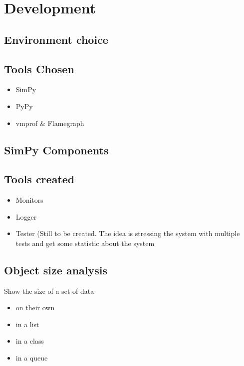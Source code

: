 
\section{Development}

\subsection{Environment choice}

\subsection{Tools Chosen}
\begin{itemize}
    \item SimPy
    \item PyPy
    \item vmprof \& Flamegraph
\end{itemize}

\subsection{SimPy Components}

\subsection{Tools created}
\begin{itemize}
    \item Monitors
    \item Logger
    \item Tester (Still to be created. The idea is stressing the system with
        multiple tests and get some statistic about the system
\end{itemize}

\subsection{Object size analysis}
Show the size of a set of data
\begin{itemize}
    \item on their own
    \item in a list
    \item in a class
    \item in a queue
\end{itemize}
